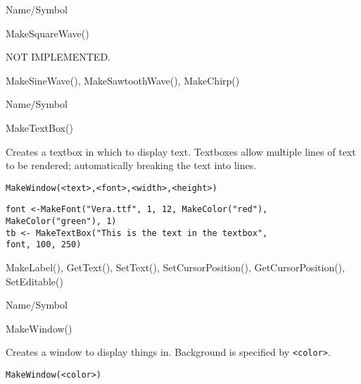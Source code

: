 \rl


\begin{desc}{Name/Symbol}
\item[Name/Symbol]	MakeSquareWave()     

\item[Description]	NOT IMPLEMENTED.

\item[Usage]		

\item[Example]	

\item[See Also]	MakeSineWave(), MakeSawtoothWave(), MakeChirp()
\end{desc}

\rl


\begin{desc}{Name/Symbol}
\item[Name/Symbol]	MakeTextBox()

\item[Description]	Creates a textbox in which to display text. 
		Textboxes allow multiple lines of text to be rendered;
		automatically breaking the text into lines. 

\item[Usage]
\begin{verbatim}
MakeWindow(<text>,<font>,<width>,<height>)
\end{verbatim}

\item[Example]	
\begin{verbatim}
font <-MakeFont("Vera.ttf", 1, 12, MakeColor("red"), 
MakeColor("green"), 1)
tb <- MakeTextBox("This is the text in the textbox", 
font, 100, 250)
\end{verbatim}

\item[See Also]	MakeLabel(), GetText(), SetText(), SetCursorPosition(),
		GetCursorPosition(), SetEditable()
\end{desc}

\rl


\begin{desc}{Name/Symbol}
\item[Name/Symbol]	MakeWindow() 

\item[Description]	Creates a window to display things in.
		Background is specified by \verb+<color>+.

\item[Usage]		
\begin{verbatim}
MakeWindow(<color>)
\end{verbatim}

\item[Example]	

\item[See Also]	
\end{desc}

